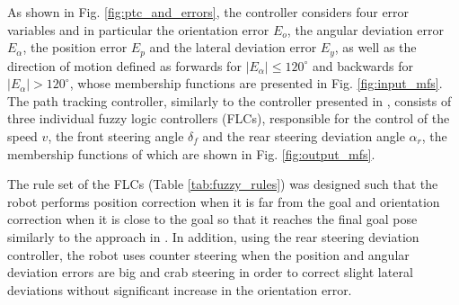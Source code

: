 \documentclass[conference]{IEEEtran}
\begin{document}
As shown in Fig. \ref{fig:ptc_and_errors}, the controller considers four error variables and in particular the orientation error $E_o$, the angular deviation error $E_\alpha$, the position error $E_p$ and the lateral deviation error $E_y$, as well as the direction of motion defined as forwards for $|E_\alpha| \leq 120^\circ$ and backwards for $|E_\alpha| > 120^\circ$, whose membership functions are presented in Fig. \ref{fig:input_mfs}. The path tracking controller, similarly to the controller presented in \cite{reactive_fuzzy_ptc}, consists of three individual fuzzy logic controllers (FLCs), responsible for the control of the speed $v$, the front steering angle $\delta_f$ and the rear steering deviation angle $\alpha_r$, the membership functions of which are shown in Fig. \ref{fig:output_mfs}.

The rule set of the FLCs (Table \ref{tab:fuzzy_rules}) was designed such that the robot performs position correction when it is far from the goal and orientation correction when it is close to the goal so that it reaches the final goal pose similarly to the approach in \cite{flc_thesis}. In addition, using the rear steering deviation controller, the robot uses counter steering when the position and angular deviation errors are big and crab steering in order to correct slight lateral deviations without significant increase in the orientation error.
\end{document}
